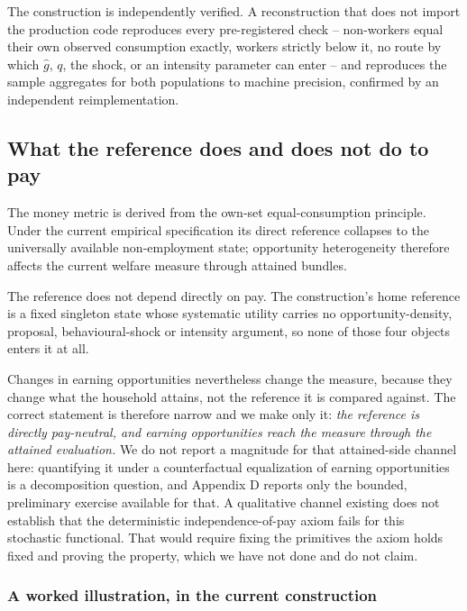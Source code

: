 \documentclass[11pt,a4paper]{article}
\begin{document}
The construction is independently verified. A reconstruction that does not import the production code reproduces every pre-registered check -- non-workers equal their own observed consumption exactly, workers strictly below it, no route by which \(\widehat g\), \(q\), the shock, or an intensity parameter can enter -- and reproduces the sample aggregates for both populations to machine precision, confirmed by an independent reimplementation.

\subsection{What the reference does and does not do to pay}\label{what-the-reference-does-and-does-not-do-to-pay}

The money metric is derived from the own-set equal-consumption principle. Under the current empirical specification its direct reference collapses to the universally available non-employment state; opportunity heterogeneity therefore affects the current welfare measure through attained bundles.

The reference does not depend directly on pay. The construction's home reference is a fixed singleton state whose systematic utility carries no opportunity-density, proposal, behavioural-shock or intensity argument, so none of those four objects enters it at all.

Changes in earning opportunities nevertheless change the measure, because they change what the household attains, not the reference it is compared against. The correct statement is therefore narrow and we make only it: \emph{the reference is directly pay-neutral, and earning opportunities reach the measure through the attained evaluation.} We do not report a magnitude for that attained-side channel here: quantifying it under a counterfactual equalization of earning opportunities is a decomposition question, and Appendix D reports only the bounded, preliminary exercise available for that. A qualitative channel existing does not establish that the deterministic independence-of-pay axiom fails for this stochastic functional. That would require fixing the primitives the axiom holds fixed and proving the property, which we have not done and do not claim.

\subsubsection{A worked illustration, in the current construction}\label{a-worked-illustration-in-the-current-construction}
\end{document}
